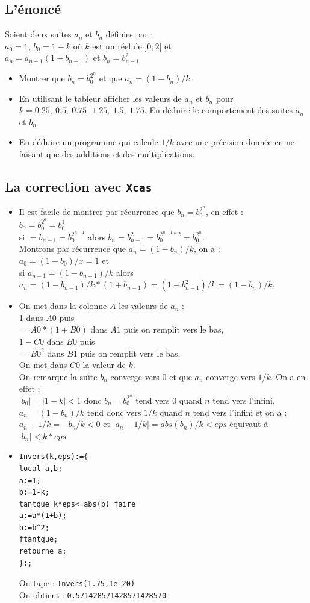 \documentclass[a4paper,11pt]{book}
\begin{document}
\subsection{L'\'enonc\'e}
Soient deux suites $a_n$ et $b_n$ d\'efinies par :\\
$a_0=1$, $b_0=1-k$ o\`u $k$ est un r\'eel de $]0;2[$ et\\
$a_n=a_{n-1}(1+b_{n-1})$ et $b_n=b_{n-1}^2$
\begin{itemize}
\item Montrer que $b_n=b_0^{2^n}$ et que $a_n=(1-b_n)/k$.
\item En utilisant le tableur afficher les valeurs de $a_n$ et $b_n$ pour 
$k=0.25,\ 0.5,\ 0.75,\ 1.25,\ 1.5,\ 1.75$. En d\'eduire le comportement des 
suites $a_n$ et $b_n$
\item En d\'eduire un programme qui calcule $1/k$ avec une pr\'ecision donn\'ee
en ne faisant que des additions et des multiplications.
\end{itemize}
\subsection{La correction avec {\tt Xcas}}
\begin{itemize}
\item Il est facile de montrer par r\'ecurrence que $b_n=b_0^{2^n}$, en 
effet :\\
$b_0=b_0^{2^0}=b_0^1$\\
si $=b_{n-1}=b_0^{2^{n-1}}$ alors  $b_n=b_{n-1}^2=b_0^{2^{n-1}*2}=b_0^{2^{n}}$.\\
Montrons par r\'ecurrence que $a_n=(1-b_n)/k$, on a :\\
$a_0=(1-b_0)/x=1$ et \\
si  $a_{n-1}=(1-b_{n-1})/k$ alors \\
$a_n=(1-b_{n-1})/k*(1+b_{n-1})=(1-b_{n-1}^2)/k=(1-b_n)/k$. 
\item On met dans la colonne $A$ les valeurs de $a_n$ :\\
1 dans $A0$ puis \\
$=A0*(1+B0)$ dans $A1$ puis on remplit vers le bas,\\
$1-C0$ dans $B0$ puis \\
$=B0^2$ dans $B1$ puis on remplit vers le bas,\\
On met dans $C0$ la valeur de $k$.\\
On remarque la suite $b_n$ converge vers 0 et que $a_n$ converge vers $1/k$.
On a en effet :\\
$|b_0|=|1-k|<1$ donc $b_n=b_0^{2^n}$ tend vers 0 quand $n$ tend vers l'infini,\\
$a_n=(1-b_n)/k$ tend donc vers $1/k$ quand  $n$ tend vers l'infini et on a :\\
$a_n-1/k=-b_n/k<0$ et $|a_n-1/k|=abs(b_n)/k<eps$ \'equivaut \`a $|b_n|<k*eps$
\item
\begin{verbatim}
Invers(k,eps):={
local a,b;
a:=1;
b:=1-k;
tantque k*eps<=abs(b) faire
a:=a*(1+b);
b:=b^2;
ftantque;
retourne a;  
}:;
\end{verbatim}
On tape : {\tt Invers(1.75,1e-20)}\\
On obtient : {\tt 0.571428571428571428570}
\end{itemize}
\end{document}
